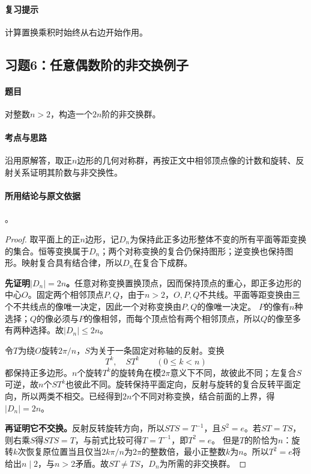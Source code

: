 \paragraph{复习提示}
计算置换乘积时始终从右边开始作用。


\subsection{习题6：\texorpdfstring{任意偶数阶的非交换例子}{任意偶数阶的非交换例子}}
\label{ex:1:6}

\paragraph{题目}
对整数$n>2$，构造一个$2n$阶的非交换群。

\paragraph{考点与思路}
沿用原解答，取正$n$边形的几何对称群，再按正文中相邻顶点像的计数和旋转、反射关系证明其阶数与非交换性。

\paragraph{所用结论与原文依据}
。


\begin{proof}
取平面上的正$n$边形，记$D_n$为保持此正多边形整体不变的所有平面等距变换的集合。恒等变换属于$D_n$；两个对称变换的复合仍保持图形；逆变换也保持图形。映射复合具有结合律，所以$D_n$在复合下成群。

\textbf{先证明$|D_n|=2n$。}任意对称变换置换顶点，因而保持顶点的重心，即正多边形的中心$O$。固定两个相邻顶点$P,Q$，由于$n>2$，$O,P,Q$不共线。平面等距变换由三个不共线点的像唯一决定，因此一个对称变换由$P,Q$的像唯一决定。
$P$的像有$n$种选择；$Q$的像必须与$P$的像相邻，而每个顶点恰有两个相邻顶点，所以$Q$的像至多有两种选择。故$|D_n|\leq2n$。

令$T$为绕$O$旋转$2\pi/n$，$S$为关于一条固定对称轴的反射。变换
\[
T^k,\quad ST^k\qquad(0\leq k<n)
\]
都保持正多边形。$n$个旋转$T^k$的旋转角在模$2\pi$意义下不同，故彼此不同；左复合$S$可逆，故$n$个$ST^k$也彼此不同。旋转保持平面定向，反射与旋转的复合反转平面定向，所以两类不相交。已经得到$2n$个不同对称变换，结合前面的上界，得$|D_n|=2n$。

\textbf{再证明它不交换。}反射反转旋转方向，所以$STS=T^{-1}$，且$S^2=e$。若$ST=TS$，则右乘$S$得$STS=T$，与前式比较可得$T=T^{-1}$，即$T^2=e$。
但是$T$的阶恰为$n$：旋转$k$次恢复原位置当且仅当$2k\pi/n$为$2\pi$的整数倍，最小正整数$k$为$n$。所以$T^2=e$将给出$n\mid2$，与$n>2$矛盾。故$ST\ne TS$，$D_n$为所需的非交换群。
\end{proof}

